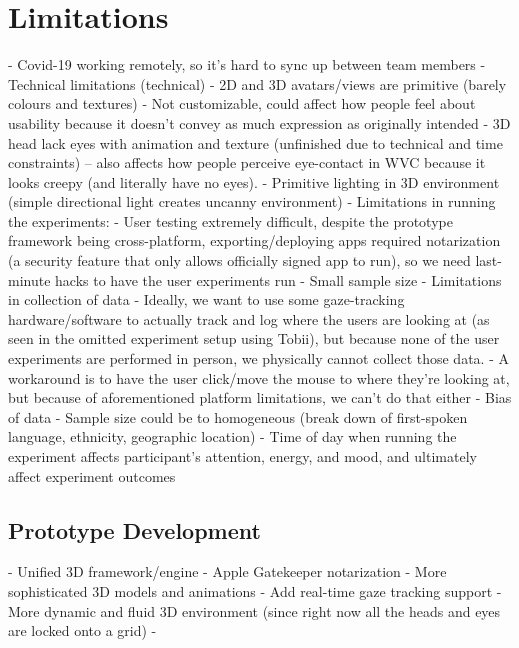 
\section{Limitations}

- Covid-19 working remotely, so it’s hard to sync up between team members
- Technical limitations (technical)
	- 2D and 3D avatars/views are primitive (barely colours and textures)
	- Not customizable, could affect how people feel about usability because it doesn’t convey as much expression as originally intended
	- 3D head lack eyes with animation and texture (unfinished due to technical and time constraints) -- also affects how people perceive eye-contact in WVC because it looks creepy (and literally have no eyes).
	- Primitive lighting in 3D environment (simple directional light creates uncanny environment)
- Limitations in running the experiments:
	- User testing extremely difficult, despite the prototype framework being cross-platform, exporting/deploying apps required notarization (a security feature that only allows officially signed app to run), so we need last-minute hacks to have the user experiments run
	- Small sample size
- Limitations in collection of data
	- Ideally, we want to use some gaze-tracking hardware/software to actually track and log where the users are looking at (as seen in the omitted experiment setup using Tobii), but because none of the user experiments are performed in person, we physically cannot collect those data.
	- A workaround is to have the user click/move the mouse to where they’re looking at, but because of aforementioned platform limitations, we can’t do that either
- Bias of data
	- Sample size could be to homogeneous (break down of first-spoken language, ethnicity, geographic location)
	- Time of day when running the experiment affects participant’s attention, energy, and mood, and ultimately affect experiment outcomes

\subsection{Prototype Development}

- Unified 3D framework/engine
- Apple Gatekeeper notarization 
- More sophisticated 3D models and animations
- Add real-time gaze tracking support
- More dynamic and fluid 3D environment (since right now all the heads and eyes are locked onto a grid)
- 